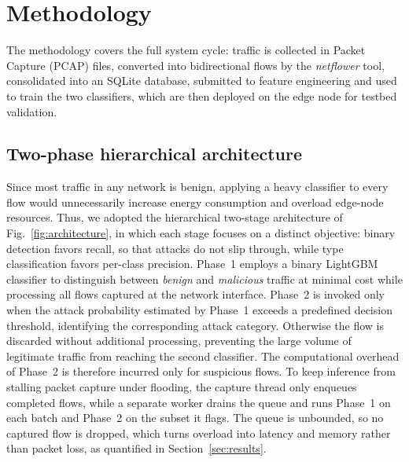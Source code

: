 \documentclass[conference]{IEEEtran}
\begin{document}
\section{Methodology}
\label{sec:methodology}

The methodology covers the full system cycle: traffic is collected in Packet
Capture (PCAP) files, converted into bidirectional flows by the
\textit{netflower} tool, consolidated into an SQLite database, submitted to
feature engineering and used to train the two classifiers, which are then
deployed on the edge node for testbed validation.

\subsection{Two-phase hierarchical architecture}
\label{subsec:architecture}

Since most traffic in any network is benign, applying a heavy classifier to
every flow would unnecessarily increase energy consumption and overload edge-node resources. Thus, we adopted the hierarchical two-stage architecture of Fig.~\ref{fig:architecture}, in which each stage focuses on a distinct objective: binary detection favors recall, so that attacks do not slip through, while type classification favors per-class precision. Phase~1 employs a binary LightGBM classifier to distinguish between \textit{benign} and \textit{malicious} traffic at minimal cost while processing all flows captured at the network interface. Phase~2 is invoked only when the attack probability estimated by Phase~1 exceeds a predefined decision threshold, identifying the corresponding attack category. Otherwise the flow is discarded without additional processing, preventing the large volume of legitimate traffic from reaching the second classifier. The computational overhead of Phase~2 is therefore incurred only for suspicious flows. To keep inference from stalling packet capture under flooding, the capture thread only enqueues completed flows, while a separate worker drains the queue and runs Phase~1 on each batch and Phase~2 on the subset it flags. The queue is unbounded, so no captured flow is dropped, which turns overload into latency and memory rather than packet loss, as quantified in Section~\ref{sec:results}.
\end{document}
